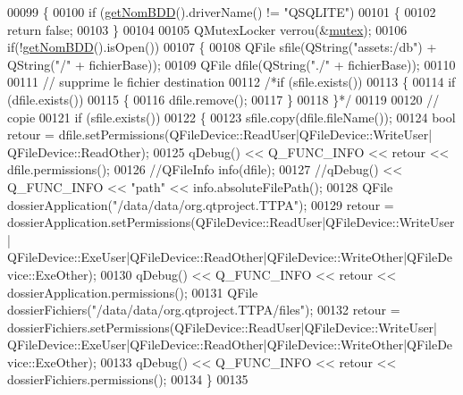 \begin{DoxyCode}
00099 \{
00100     \textcolor{keywordflow}{if} (\hyperlink{class_base_de_donnees_a467909531ae3cdebaf173f6e97cdc624}{getNomBDD}().driverName() != \textcolor{stringliteral}{"QSQLITE"})
00101     \{
00102         \textcolor{keywordflow}{return} \textcolor{keyword}{false};
00103     \}
00104 
00105     QMutexLocker verrou(&\hyperlink{class_base_de_donnees_aa1b4696fac87a740f914aa73739086f2}{mutex});
00106     \textcolor{keywordflow}{if}(!\hyperlink{class_base_de_donnees_a467909531ae3cdebaf173f6e97cdc624}{getNomBDD}().isOpen())
00107     \{
00108        QFile sfile(QString(\textcolor{stringliteral}{"assets:/db"}) + QString(\textcolor{stringliteral}{"/"} + fichierBase));
00109        QFile dfile(QString(\textcolor{stringliteral}{"./"} + fichierBase));
00110 
00111        \textcolor{comment}{// supprime le fichier destination}
00112        \textcolor{comment}{/*if (sfile.exists())}
00113 \textcolor{comment}{       \{}
00114 \textcolor{comment}{           if (dfile.exists())}
00115 \textcolor{comment}{           \{}
00116 \textcolor{comment}{               dfile.remove();}
00117 \textcolor{comment}{           \}}
00118 \textcolor{comment}{       \}*/}
00119 
00120        \textcolor{comment}{// copie}
00121        \textcolor{keywordflow}{if} (sfile.exists())
00122        \{
00123            sfile.copy(dfile.fileName());
00124            \textcolor{keywordtype}{bool} retour = dfile.setPermissions(QFileDevice::ReadUser|QFileDevice::WriteUser|
      QFileDevice::ReadOther);
00125            qDebug() << Q\_FUNC\_INFO << retour << dfile.permissions();
00126            \textcolor{comment}{//QFileInfo info(dfile);}
00127            \textcolor{comment}{//qDebug() << Q\_FUNC\_INFO << "path" << info.absoluteFilePath();}
00128            QFile dossierApplication(\textcolor{stringliteral}{"/data/data/org.qtproject.TTPA"});
00129            retour = dossierApplication.setPermissions(QFileDevice::ReadUser|QFileDevice::WriteUser|
      QFileDevice::ExeUser|QFileDevice::ReadOther|QFileDevice::WriteOther|QFileDevice::ExeOther);
00130            qDebug() << Q\_FUNC\_INFO << retour << dossierApplication.permissions();
00131            QFile dossierFichiers(\textcolor{stringliteral}{"/data/data/org.qtproject.TTPA/files"});
00132            retour = dossierFichiers.setPermissions(QFileDevice::ReadUser|QFileDevice::WriteUser|
      QFileDevice::ExeUser|QFileDevice::ReadOther|QFileDevice::WriteOther|QFileDevice::ExeOther);
00133            qDebug() << Q\_FUNC\_INFO << retour << dossierFichiers.permissions();
00134        \}
00135 

\end{DoxyCode}
